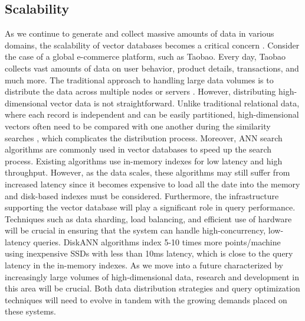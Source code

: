 \documentclass[11pt]{article}
\begin{document}
\subsection{Scalability}
As we continue to generate and collect massive amounts of data in various domains, the scalability of vector databases becomes a critical concern \cite{DBLP:journals/tbd/JohnsonDJ21,DBLP:journals/jcisd/TingleTCGKDMI23,DBLP:journals/pvldb/ChatzakisFKPP23}. 
Consider the case of a global e-commerce platform, such as Taobao. Every day, Taobao collects vast amounts of data on user behavior, product details, transactions, and much more.
%
The traditional approach to handling large data volumes is to distribute the data across multiple nodes or servers \cite{DBLP:conf/cidr/CherniackBBCCXZ03}. However, distributing high-dimensional vector data is not straightforward. Unlike traditional relational data, where each record is independent and can be easily partitioned, high-dimensional vectors often need to be compared with one another during the similarity searches \cite{DBLP:journals/access/YangZCY19}, which complicates the distribution process. 
%
%
Moreover, ANN search algorithms are commonly used in vector databases to speed up the search process. 
Existing algorithms use in-memory indexes for low latency and high throughput. However, as the data scales, these algorithms may still suffer from increased latency since it becomes expensive to load all the date into the memory and disk-based indexes must be considered. 
Furthermore, the infrastructure supporting the vector database will play a significant role in query performance. Techniques such as data sharding, load balancing, and efficient use of hardware will be crucial in ensuring that the system can handle high-concurrency, low-latency queries. 
DiskANN algorithms \cite{NEURIPS2019_09853c7f, DBLP:journals/corr/abs-2211-12850} index 5-10 times more points/machine using inexpensive SSDs with less than 10ms latency, which is close to the query latency in the in-memory indexes.
As we move into a future characterized by increasingly large volumes of high-dimensional data, research and development in this area will be crucial. Both data distribution strategies and query optimization techniques will need to evolve in tandem with the growing demands placed on these systems.
\end{document}
